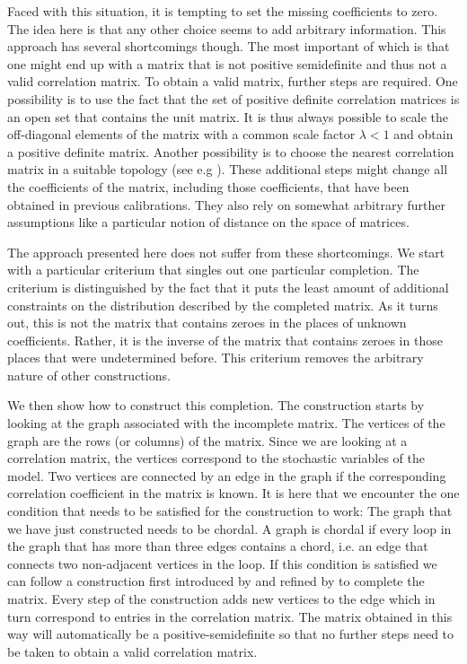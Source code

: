 \documentclass[11pt, a4paper]{article}
\begin{document}
Faced with this situation, it is tempting to set the missing coefficients to zero. The idea here is that any other choice seems to add arbitrary information. This approach has several shortcomings though. The most important of which is that one might end up with a matrix that is not positive semidefinite and thus not a valid correlation matrix. To obtain a valid matrix, further steps are required. One possibility is to use the fact that the set of positive definite correlation matrices is an open set that contains the unit matrix. It is thus always possible to scale the off-diagonal elements of the matrix with a common scale factor $\lambda<1$ and obtain a positive definite matrix. Another possibility is to choose the nearest correlation matrix in a suitable topology (see e.g \cite{higham}). These additional steps might change all the coefficients of the matrix, including those coefficients, that have been obtained in previous calibrations. They also rely on somewhat arbitrary further assumptions like a particular notion of distance on the space of matrices. 

The approach presented here does not suffer from these shortcomings. We start with a particular criterium that singles out one particular completion. The criterium is distinguished by the fact that it puts the least amount of additional constraints on the distribution described by the completed matrix. As it turns out, this is not the matrix that contains zeroes in the places of unknown coefficients. Rather, it is the inverse of the matrix that contains zeroes in those places that were undetermined before. This criterium removes the arbitrary nature of other constructions. 

We then show how to construct this completion. The construction starts by looking at the graph associated with the incomplete matrix. The vertices of the graph are the rows (or columns) of the matrix. Since we are looking at a correlation matrix, the vertices correspond to the stochastic variables of the model. Two vertices are connected by an edge in the graph if the corresponding correlation coefficient in the matrix is known. It is here that we encounter the one condition that needs to be satisfied for the construction to work: The graph that we have just constructed needs to be chordal. A graph is chordal if every loop in the graph that has more than three edges contains a chord, i.e. an edge that connects two non-adjacent vertices in the loop. If this condition is satisfied we can follow a construction first introduced by \cite{grone} and refined by \cite{smith} to complete the matrix. Every step of the construction adds new vertices to the edge which in turn correspond to entries in the correlation matrix. The matrix obtained in this way will automatically be a positive-semidefinite so that no further steps need to be taken to obtain a valid correlation matrix. 
\end{document}
